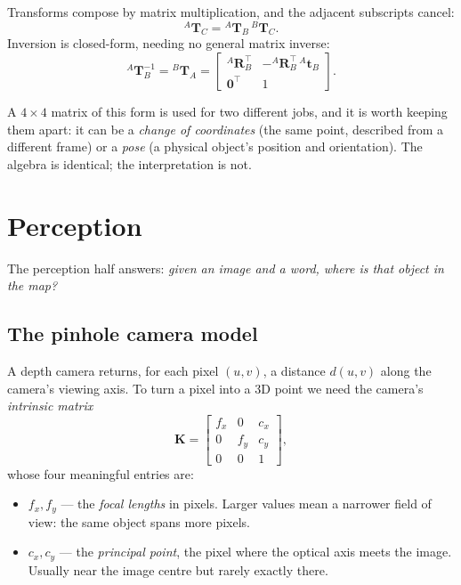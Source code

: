 \documentclass[11pt,a4paper]{article}
\newcommand{\Tf}[2]{{}^{#1}\mathbf{T}_{#2}}
\newcommand{\Rot}[2]{{}^{#1}\mathbf{R}_{#2}}
\begin{document}
Transforms compose by matrix multiplication, and the adjacent subscripts cancel:
\begin{equation}
\Tf{A}{C} = \Tf{A}{B}\, \Tf{B}{C}.
\label{eq:compose}
\end{equation}
Inversion is closed-form, needing no general matrix inverse:
\begin{equation}
\Tf{A}{B}^{-1} = \Tf{B}{A} =
\begin{bmatrix}
\Rot{A}{B}^\top & -\Rot{A}{B}^\top\, {}^{A}\mathbf{t}_{B} \\
\mathbf{0}^\top & 1
\end{bmatrix}.
\end{equation}

A $4\times4$ matrix of this form is used for two different jobs, and it is worth
keeping them apart: it can be a \emph{change of coordinates} (the same point,
described from a different frame) or a \emph{pose} (a physical object's position
and orientation). The algebra is identical; the interpretation is not.

\section{Perception}

The perception half answers: \emph{given an image and a word, where is that
object in the map?}

\subsection{The pinhole camera model}

A depth camera returns, for each pixel $(u,v)$, a distance $d(u,v)$ along the
camera's viewing axis. To turn a pixel into a 3D point we need the camera's
\emph{intrinsic matrix}
\begin{equation}
\mathbf{K} =
\begin{bmatrix}
f_x & 0 & c_x \\
0 & f_y & c_y \\
0 & 0 & 1
\end{bmatrix},
\end{equation}
whose four meaningful entries are:
\begin{itemize}
\item $f_x, f_y$ --- the \emph{focal lengths} in pixels. Larger values mean a
      narrower field of view: the same object spans more pixels.
\item $c_x, c_y$ --- the \emph{principal point}, the pixel where the optical axis
      meets the image. Usually near the image centre but rarely exactly there.
\end{itemize}
\end{document}
